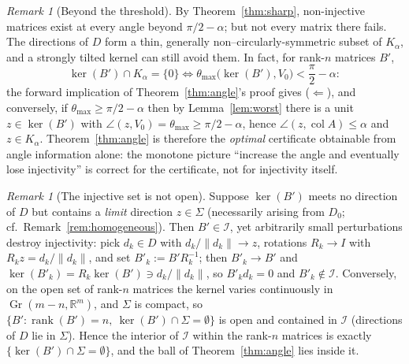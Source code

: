 \documentclass[11pt]{article}
\numberwithin{equation}{section}
\theoremstyle{remark}
\newtheorem{remark}[theorem]{Remark}
\newcommand{\R}{\mathbb{R}}
\DeclareMathOperator{\col}{col}
\DeclareMathOperator{\rank}{rank}
\DeclareMathOperator{\Gr}{Gr}
\newcommand{\norm}[1]{\lVert #1\rVert}
\newcommand{\Kal}{K_{\alpha}}
\begin{document}
\begin{remark}[Beyond the threshold]\label{rem:beyond}
By Theorem~\ref{thm:sharp}, non-injective matrices exist at every angle beyond $\pi/2-\alpha$; but not every matrix there fails. The directions of $D$ form a thin, generally non--circularly-symmetric subset of $\Kal$, and a strongly tilted kernel can still avoid them. In fact, for rank-$n$ matrices $B'$,
\[
\ker(B')\cap\Kal=\{0\}
\iff
\theta_{\max}\bigl(\ker(B'),V_0\bigr)<\frac{\pi}{2}-\alpha :
\]
the forward implication of Theorem~\ref{thm:angle}'s proof gives ($\Leftarrow$), and conversely, if $\theta_{\max}\ge\pi/2-\alpha$ then by Lemma~\ref{lem:worst} there is a unit $z\in\ker(B')$ with $\angle(z,V_0)=\theta_{\max}\ge\pi/2-\alpha$, hence $\angle(z,\col A)\le\alpha$ and $z\in\Kal$. Theorem~\ref{thm:angle} is therefore the \emph{optimal} certificate obtainable from angle information alone: the monotone picture ``increase the angle and eventually lose injectivity'' is correct for the certificate, not for injectivity itself.
\end{remark}

\begin{remark}[The injective set is not open]\label{rem:notopen}
Suppose $\ker(B')$ meets no direction of $D$ but contains a \emph{limit} direction $z\in\Sigma$ (necessarily arising from $D_0$; cf.\ Remark~\ref{rem:homogeneous}). Then $B'\in\mathcal I$, yet arbitrarily small perturbations destroy injectivity: pick $d_k\in D$ with $d_k/\norm{d_k}\to z$, rotations $R_k\to I$ with $R_k z=d_k/\norm{d_k}$, and set $B'_k:=B'R_k^{-1}$; then $B'_k\to B'$ and $\ker(B'_k)=R_k\ker(B')\ni d_k/\norm{d_k}$, so $B'_k d_k=0$ and $B'_k\notin\mathcal I$. Conversely, on the open set of rank-$n$ matrices the kernel varies continuously in $\Gr(m-n,\R^m)$, and $\Sigma$ is compact, so $\{B' : \rank(B')=n,\ \ker(B')\cap\Sigma=\emptyset\}$ is open and contained in $\mathcal I$ (directions of $D$ lie in $\Sigma$). Hence the interior of $\mathcal I$ within the rank-$n$ matrices is exactly $\{\ker(B')\cap\Sigma=\emptyset\}$, and the ball of Theorem~\ref{thm:angle} lies inside it.
\end{remark}
\end{document}
